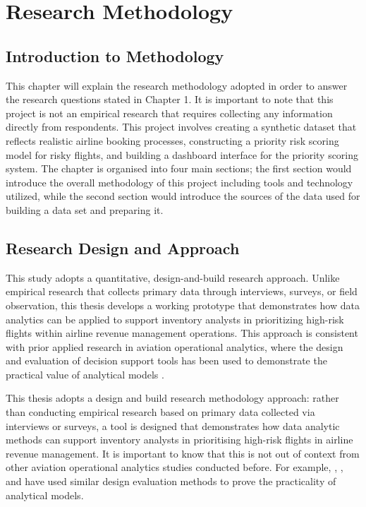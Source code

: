 \chapter{Research Methodology}
\label{ch:methodology}

\section{Introduction to Methodology}

This chapter will explain the research methodology adopted in order to answer the research questions stated in Chapter 1. It is important to note that this project is not an empirical research that requires collecting any information directly from respondents. This project involves creating a synthetic dataset that reflects realistic airline booking processes, constructing a priority risk scoring model for risky flights, and building a dashboard interface for the priority scoring system. The chapter is organised into four main sections; the first section would introduce the overall methodology of this project including tools and technology utilized, while the second section would introduce the sources of the data used for building a data set and preparing it.

\section{Research Design and Approach}

This study adopts a quantitative, design-and-build research approach. Unlike empirical research that collects primary data through interviews, surveys, or field observation, this thesis develops a working prototype that demonstrates how data analytics can be applied to support inventory analysts in prioritizing high-risk flights within airline revenue management operations. This approach is consistent with prior applied research in aviation operational analytics, where the design and evaluation of decision support tools has been used to demonstrate the practical value of analytical models \citep{RakshitKrishnamurthyYu1996, Salleh2023, WatsonWixomHoffer2006}.

This thesis adopts a design and build research methodology approach: rather than conducting empirical research based on primary data collected via interviews or surveys, a tool is designed that demonstrates how data analytic methods can support inventory analysts in prioritising high-risk flights in airline revenue management. It is important to know that this is not out of context from other aviation operational analytics studies conducted before. For example, \citet{RakshitKrishnamurthyYu1996}, \citet{Salleh2023}, and \citet{WatsonWixomHoffer2006} have used similar design evaluation methods to prove the practicality of analytical models.

